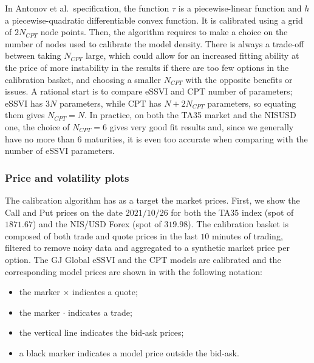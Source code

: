 \documentclass{article}
\providecommand{\tightlist}{%
      \setlength{\itemsep}{0pt}\setlength{\parskip}{0pt}}
\begin{document}
	In Antonov et al.~specification, the function \(\tau\) is a
piecewise-linear function and \(h\) a piecewise-quadratic differentiable
convex function. It is calibrated using a grid of \(2N_{CPT}\) node
points. Then, the algorithm requires to make a choice on the number of
nodes used to calibrate the model density. There is always a trade-off
between taking \(N_{CPT}\) large, which could allow for an increased
fitting ability at the price of more instability in the results if there
are too few options in the calibration basket, and choosing a smaller
\(N_{CPT}\) with the opposite benefits or issues. A rational start is to
compare eSSVI and CPT number of parameters; eSSVI has \(3N\) parameters,
while CPT has \(N+2N_{CPT}\) parameters, so equating them gives
\(N_{CPT}=N\). In practice, on both the TA35 market and the NISUSD one,
the choice of \(N_{CPT}=6\) gives very good fit results and, since we
generally have no more than \(6\) maturities, it is even too accurate
when comparing with the number of eSSVI parameters.

	\hypertarget{price-and-volatility-plots}{%
\subsubsection{Price and volatility
plots}\label{price-and-volatility-plots}}

	The calibration algorithm has as a target the market prices. First, we
show the Call and Put prices on the date \(2021/10/26\) for both the
TA35 index (spot of \(1871.67\)) and the NIS/USD Forex (spot of
\(319.98\)). The calibration basket is composed of both trade and quote
prices in the last \(10\) minutes of trading, filtered to remove noisy
data and aggregated to a synthetic market price per option. The GJ
Global eSSVI and the CPT models are calibrated and the corresponding
model prices are shown in 
with the following notation:

\begin{itemize}
\tightlist
\item
  the marker \(\times\) indicates a quote;
\item
  the marker \(\cdot\) indicates a trade;
\item
  the vertical line indicates the bid-ask prices;
\item
  a black marker indicates a model price outside the bid-ask.
\end{itemize}
\end{document}
